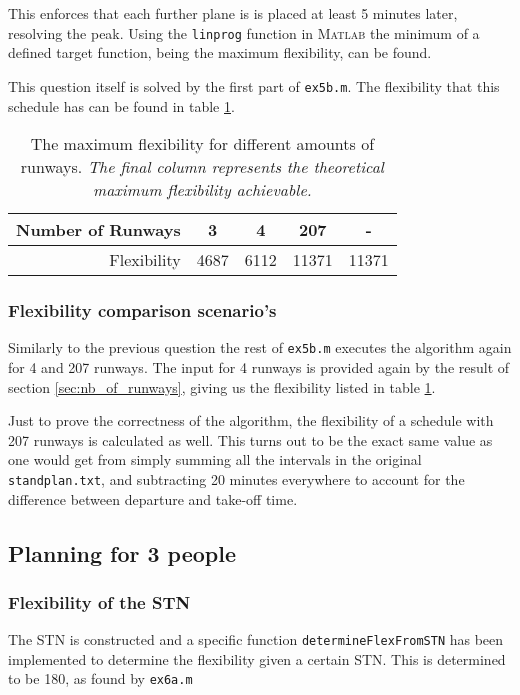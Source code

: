 \documentclass[10pt,a4paper]{article}
\begin{document}
This enforces that each further plane is is placed at least 5 minutes later, resolving the peak. Using the \texttt{linprog} function in \textsc{Matlab} the minimum of a defined target function, being the maximum flexibility, can be found.

This question itself is solved by the first part of \texttt{ex5b.m}. The flexibility that this schedule has can be found in table \ref{table:flex}. 

\begin{table}
\centering
\begin{tabular}{ r || c | c | c | c}

Number of Runways & 3 & 4 & 207 & - \\ \hline
Flexibility & 4687 &  6112 & 11371 & 11371
\end{tabular}
\caption{The maximum flexibility for different amounts of runways. \emph{The final column represents the theoretical maximum flexibility achievable.}}
\label{table:flex}
\end{table}


\subsubsection{Flexibility comparison scenario's}
Similarly to the previous question the rest of \texttt{ex5b.m} executes the algorithm again for 4 and 207 runways. The input for 4 runways is provided again by the result of section \ref{sec:nb_of_runways}, giving us the flexibility listed in table \ref{table:flex}.

Just to prove the correctness of the algorithm, the flexibility of a schedule with 207 runways is calculated as well. This turns out to be the exact same value as one would get from simply summing all the intervals in the original \texttt{standplan.txt}, and subtracting 20 minutes everywhere to account for the difference between departure and take-off time.

\subsection{Planning for 3 people}
\subsubsection{Flexibility of the STN}
\label{sec:flex_boerkoel_1}

The STN is constructed and a specific function \texttt{determineFlexFromSTN} has been implemented to determine the flexibility given a certain STN. This is determined to be 180, as found by \texttt{ex6a.m}
\end{document}
